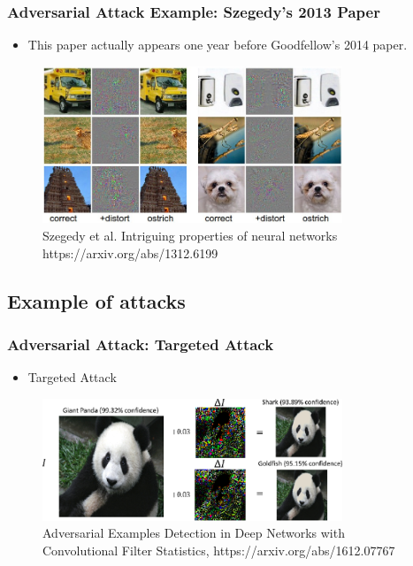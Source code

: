 \documentclass[9pt,dvipsnames]{beamer}
\begin{document}
\begin{frame}
    \frametitle{Adversarial Attack Example: Szegedy’s 2013 Paper}

    \begin{itemize}
        \item This paper actually appears one year before Goodfellow's 2014 paper.
    \end{itemize}
    \begin{figure}[ht]
        \centering
        \includegraphics[width=0.8\textwidth]{imgs/adv_overview_2.png}
        \caption{Szegedy et al. Intriguing properties of neural networks https://arxiv.org/abs/1312.6199}
    \end{figure}
\end{frame}

\subsection{Example of attacks}
\begin{frame}
    \frametitle{Adversarial Attack: Targeted Attack}
    \begin{itemize}
        \item Targeted Attack
    \end{itemize}
    \begin{figure}[ht]
        \centering
        \includegraphics[width=0.8\textwidth]{imgs/adv_overview_3.png}
        \caption{Adversarial Examples Detection in Deep Networks with Convolutional Filter Statistics, https://arxiv.org/abs/1612.07767}
    \end{figure}
\end{frame}
\end{document}
